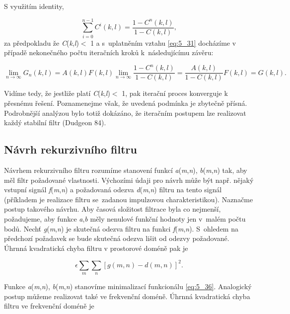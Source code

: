 S využitím identity,

\begin{equation} \label{eq:5_34}
    \sum\limits_{i=0}^{n-1} C^i(k, l) = \frac{1 - C^n(k, l)}{1 - C(k, l)},
\end{equation}
za předpokladu že \textbar \textit{C}(\textit{k},\textit{l})\textbar  $<$ 1 a s~uplatněním vztahu \eqref{eq:5_31} docházíme v případě nekonečného počtu iteračních kroků k~následujícímu závěru:

\begin{equation} \label{eq:5_35}
    \lim\limits_{n \rightarrow \infty} G_n(k, l) = A(k, l) F(k, l) \lim\limits_{n \rightarrow \infty} \frac{1 - C^n(k, l)}{1 - C(k, l)} = \frac{A(k, l)}{1 - C(k, l)} F(k, l) = G(k, l).
\end{equation}

Vidíme tedy, že jestliže platí \textbar \textit{C}(\textit{k},\textit{l})\textbar  $<$ 1, pak iterační proces konverguje k přesnému řešení. Poznamenejme však, že uvedená podmínka je zbytečně přísná. Podrobnější analýzou bylo totiž dokázáno, že iteračním postupem lze realizovat každý stabilní filtr (Dudgeon 84).

\subsection*{Návrh rekurzivního filtru}

Návrhem rekurzivního filtru rozumíme stanovení funkcí \textit{a}(\textit{m},\textit{n}), \textit{b}(\textit{m},\textit{n}) tak, aby měl filtr požadované vlastnosti. Výchozími údaji pro návrh může být např. nějaký vstupní signál \textit{f}(\textit{m},\textit{n}) a požadovaná odezva \textit{d}(\textit{m},\textit{n}) filtru na tento signál (příkladem je realizace filtru se~zadanou impulzovou charakteristikou). Naznačme postup takového návrhu. Aby časová složitost filtrace byla co nejmenší, požadujeme, aby funkce \textit{a},\textit{b} měly nenulové funkční hodnoty jen v~malém počtu bodů. Nechť \textit{g}(\textit{m},\textit{n}) je skutečná odezva filtru na funkci \textit{f}(\textit{m},\textit{n}). S~ohledem na předchozí požadavek se bude skutečná odezva lišit od odezvy požadované. Úhrnná kvadratická chyba filtru v prostorové doméně pak je

\begin{equation} \label{eq:5_36}
    \epsilon \sum\limits_{m} \sum\limits_{n} \left[ g(m, n) - d(m, n) \right]^2.
\end{equation}

Funkce \textit{a}(\textit{m},\textit{n}), \textit{b}(\textit{m},\textit{n}) stanovíme minimalizací funkcionálu \eqref{eq:5_36}. Analogický postup můžeme realizovat také ve frekvenční doméně. Úhrnná kvadratická chyba filtru ve frekvenční doméně je

